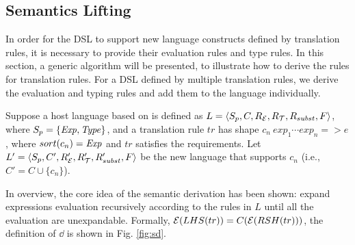 \subsection{Semantics Lifting}


In order for the DSL to support new language constructs defined by translation rules, 
 it is necessary to provide their evaluation rules and type rules.
In this section, a generic algorithm will be presented, 
 to illustrate how to derive the rules for translation rules.
For a DSL defined by multiple translation rules, 
 we derive the evaluation and typing rules and add them to the language individually.

Suppose a host language based on \STLC is defined as $L=\langle S_p, C, R_{\mathcal{E}}, R_{\mathcal{T}}, R_{subst}, F\rangle$,
where $S_p=\{\mathit{Exp},\mathit{Type}\}$,
and a translation rule $tr$ has shape $c_n~exp_1\cdots exp_n => e$,
where $sort(c_n)=\mathit{Exp}$ and $tr$ satisfies the requirements.
Let $L'=\langle S_p, C', R'_{\mathcal{E}}, R'_{\mathcal{T}}, R'_{subst}, F\rangle$ be the new language that supports $c_n$ (i.e., $C'=C \cup \{c_n\}$).

In overview, the core idea of the semantic derivation has been shown: 
 expand expressions evaluation recursively according to the rules in $L$ 
 until all the evaluation are unexpandable.
Formally, $\mathcal{E}(LHS(tr))=C(\mathcal{E}(RSH(tr)))$, the definition of $\dd$ is shown in Fig. \ref{fig:sd}.


